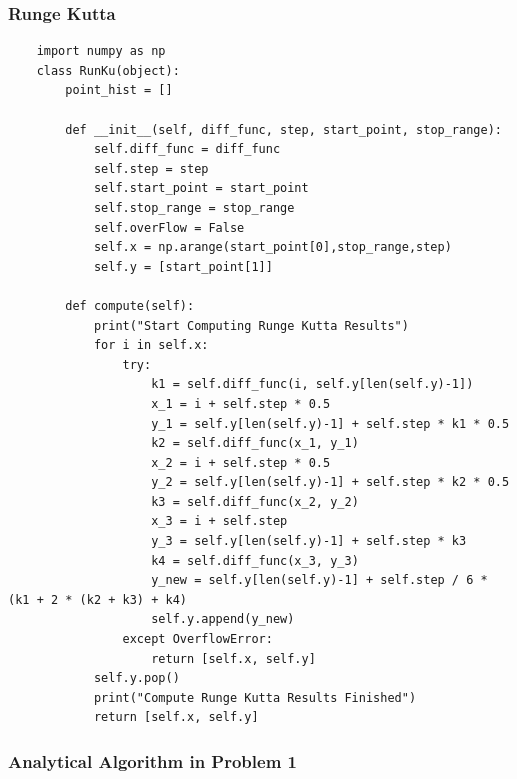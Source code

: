 \documentclass[11pt,a4paper]{article}
\begin{document}
\subsubsection{Runge Kutta}

\begin{lstlisting}
	import numpy as np
	class RunKu(object):
		point_hist = []

		def __init__(self, diff_func, step, start_point, stop_range):
			self.diff_func = diff_func
			self.step = step
			self.start_point = start_point
			self.stop_range = stop_range
			self.overFlow = False
			self.x = np.arange(start_point[0],stop_range,step)
			self.y = [start_point[1]]

		def compute(self):
			print("Start Computing Runge Kutta Results")
			for i in self.x:
				try:
					k1 = self.diff_func(i, self.y[len(self.y)-1])
					x_1 = i + self.step * 0.5
					y_1 = self.y[len(self.y)-1] + self.step * k1 * 0.5
					k2 = self.diff_func(x_1, y_1)
					x_2 = i + self.step * 0.5
					y_2 = self.y[len(self.y)-1] + self.step * k2 * 0.5
					k3 = self.diff_func(x_2, y_2)
					x_3 = i + self.step
					y_3 = self.y[len(self.y)-1] + self.step * k3
					k4 = self.diff_func(x_3, y_3)
					y_new = self.y[len(self.y)-1] + self.step / 6 * (k1 + 2 * (k2 + k3) + k4)
					self.y.append(y_new)
				except OverflowError:
					return [self.x, self.y]
			self.y.pop()
			print("Compute Runge Kutta Results Finished")
			return [self.x, self.y]
\end{lstlisting}

\subsubsection{Analytical Algorithm in Problem 1}
\end{document}
